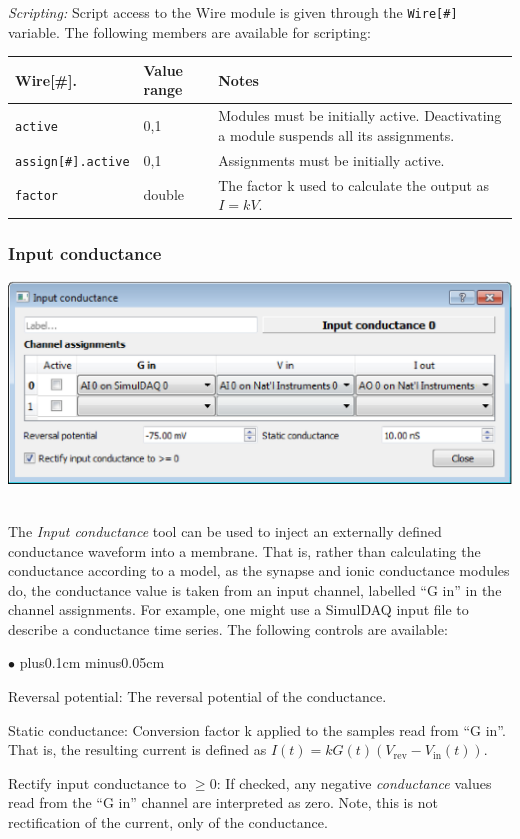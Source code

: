 \documentclass{article}
\newenvironment{myitem}{\begin{list}{$\bullet$}{\setlength{\leftmargin}{1.1em}
\itemsep0.1cm plus0.1cm minus0.05cm
\listparindent0cm
\addtolength{\labelsep}{0.5\labelsep}
\setlength{\labelwidth}{0.8em}
\setlength{\leftmargin}{\labelwidth}
\addtolength{\leftmargin}{\labelsep}
}}{\end{list}}
\begin{document}
\noindent
\emph{Scripting:} Script access to the Wire module is given through the \texttt{Wire[\#]} variable.
The following members are available for scripting: \\
\begin{tabularx}{\linewidth}{|ll|X|}
	\hline
	{\bf Wire[\#].\textvisiblespace} & {\bf Value range} & {\bf Notes} \\
	\hline
	\texttt{active} & 0,1 & Modules must be initially active. Deactivating a module suspends all
	its assignments. \\
	\texttt{assign[\#].active} & 0,1 & Assignments must be initially active. \\
	\texttt{factor} & double & The factor k used to calculate the output as $I=kV$.\\
	\hline
\end{tabularx}

\subsubsection{Input conductance}
\noindent
\parbox{\textwidth}{
	\includegraphics[scale=0.5]{inputConductance}
} \\[0.2cm]
The \emph{Input conductance} tool can be used to inject an externally defined conductance waveform
into a membrane. That is, rather than calculating the conductance according to a model, as the synapse
and ionic conductance modules do, the conductance value is taken from an input channel,
labelled ``G in'' in the channel assignments. For example, one might use a SimulDAQ input file to
describe a conductance time series. The following controls are available:
\begin{myitem}
	\item Reversal potential: The reversal potential of the conductance.
	\item Static conductance: Conversion factor k applied to the samples read from ``G in''. That is,
	the resulting current is defined as $I(t) = k G(t) (V_{\text{rev}} - V_{\text{in}}(t))$.
	\item Rectify input conductance to $\geq 0$: If checked, any negative \emph{conductance} values read
	from the ``G in'' channel are interpreted as zero. Note, this is not rectification of the current,
	only of the conductance.
\end{myitem}
\end{document}
